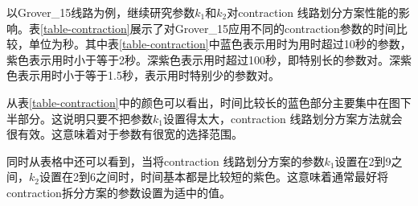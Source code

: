 以Grover\_15线路为例，继续研究参数$k_1$和$k_2$对contraction 线路划分方案性能的影响。表\ref{table-contraction}展示了对Grover\_15应用不同的contraction参数的时间比较，单位为秒。其中表\ref{table-contraction}中蓝色表示用时为用时超过10秒的参数，紫色表示用时小于等于2秒。深紫色表示用时超过100秒，即特别长的参数对。深紫色表示用时小于等于1.5秒，表示用时特别少的参数对。

从表\ref{table-contraction}中的颜色可以看出，时间比较长的蓝色部分主要集中在图下半部分。这说明只要不把参数$k_1$设置得太大，contraction 线路划分方案方法就会很有效。这意味着对于参数有很宽的选择范围。

同时从表格中还可以看到，当将contraction 线路划分方案的参数$k_1$设置在2到9之间，$k_2$设置在2到6之间时，时间基本都是比较短的紫色。这意味着通常最好将contraction拆分方案的参数设置为适中的值。


